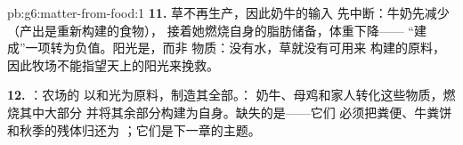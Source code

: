\begin{solution}{pb:g6:matter-from-food:1}
\textbf{11.} 草不再生产，因此奶牛的输入
先中断：牛奶先减少（产出是重新构建的食物），
接着她燃烧自身的脂肪储备，体重下降——
“建成”一项转为负值。阳光是，而非
物质：没有水，草就没有可用来
构建的原料，因此牧场不能指望天上的阳光来挽救。

\textbf{12.} ：农场的
以和光为原料，制造其全部。：
奶牛、母鸡和家人转化这些物质，燃烧其中大部分
并将其余部分构建为自身。缺失的是——它们
必须把粪便、牛粪饼和秋季的残体归还为
；它们是下一章的主题。
\end{solution}
